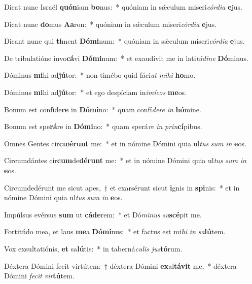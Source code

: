 \item Dicat nunc Israël \textbf{quón}iam \textbf{bo}nus:~* quóniam in sǽculum miseri\textit{cór}\textit{di}\textit{a} \textbf{e}jus.
\item Dicat nunc \textbf{do}mus \textbf{A}\textbf{a}ron:~* quóniam in sǽculum miseri\textit{cór}\textit{di}\textit{a} \textbf{e}jus.
\item Dicant nunc qui \textbf{ti}ment \textbf{Dó}\textbf{mi}num:~* quóniam in sǽculum miseri\textit{cór}\textit{di}\textit{a} \textbf{e}jus.
\item De tribulatióne invo\textbf{cá}vi \textbf{Dó}\textbf{mi}num:~* et exaudívit me in lati\textit{tú}\textit{di}\textit{ne} \textbf{Dó}minus.
\item Dóminus \textbf{mi}hi ad\textbf{jú}tor:~* non timébo quid fáci\textit{at} \textit{mi}\textit{hi} \textbf{ho}mo.
\item Dóminus \textbf{mi}hi ad\textbf{jú}tor:~* et ego despíciam in\textit{i}\textit{mí}\textit{cos} \textbf{me}os.
\item Bonum est confíde\textbf{re} in \textbf{Dó}\textbf{mi}no:~* quam confí\textit{de}\textit{re} \textit{in} \textbf{hó}mine.
\item Bonum est spe\textbf{rá}re in \textbf{Dó}\textbf{mi}no:~* quam sperá\textit{re} \textit{in} \textit{prin}\textbf{cí}pibus.
\item Omnes Gentes cir\textbf{cu}i\textbf{é}\textbf{runt} me:~* et in nómine Dómini quia ul\textit{tus} \textit{sum} \textit{in} \textbf{e}os.
\item Circumdántes cir\textbf{cum}de\textbf{dé}\textbf{runt} me:~* et in nómine Dómini quia ul\textit{tus} \textit{sum} \textit{in} \textbf{e}os.
\item Circumdedérunt me sicut apes,~† et exarsérunt sicut \textbf{i}gnis in \textbf{spi}nis:~* et in nómine Dómini quia ul\textit{tus} \textit{sum} \textit{in} \textbf{e}os.
\item Impúlsus evérsus \textbf{sum} ut \textbf{cá}\textbf{de}rem:~* et Dó\textit{mi}\textit{nus} \textit{su}\textbf{scé}pit me.
\item Fortitúdo mea, et laus \textbf{me}a \textbf{Dó}\textbf{mi}nus:~* et factus est mi\textit{hi} \textit{in} \textit{sa}\textbf{lú}tem.
\item Vox exsultatiónis, \textbf{et} sa\textbf{lú}tis:~* in taberná\textit{cu}\textit{lis} \textit{jus}\textbf{tó}rum.
\item Déxtera Dómini fecit virtútem:~† déxtera Dómini \textbf{ex}al\textbf{tá}\textbf{vit} me,~* déxtera Dómini \textit{fe}\textit{cit} \textit{vir}\textbf{tú}tem.
